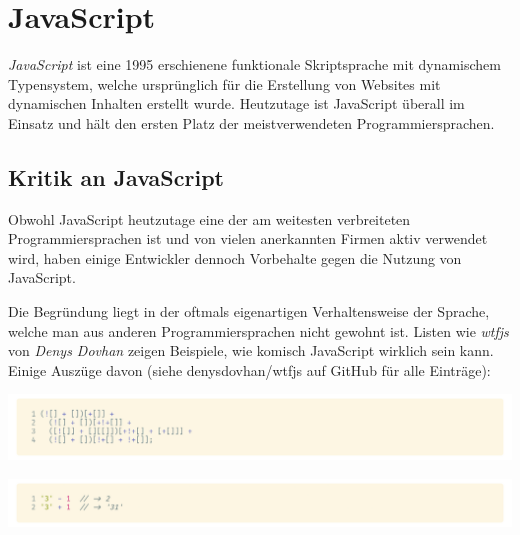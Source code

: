 \section{JavaScript}
\label{javascript}

\textit{JavaScript} ist eine 1995 erschienene funktionale Skriptsprache mit dynamischem Typensystem, welche ursprünglich für die Erstellung von Websites mit dynamischen Inhalten erstellt wurde. Heutzutage ist JavaScript überall im Einsatz und hält den ersten Platz der meistverwendeten Programmiersprachen. \cite{technostacks2021}

\subsection{Kritik an JavaScript}

Obwohl JavaScript heutzutage eine der am weitesten verbreiteten Programmiersprachen ist und von vielen anerkannten Firmen aktiv verwendet wird, haben einige Entwickler dennoch Vorbehalte gegen die Nutzung von JavaScript.~\cite{keenetheng2016}

Die Begründung liegt in der oftmals eigenartigen Verhaltensweise der Sprache, welche man aus anderen Programmiersprachen nicht gewohnt ist. Listen wie \textit{wtfjs} von \textit{Denys Dovhan} zeigen Beispiele, wie komisch JavaScript wirklich sein kann. Einige Auszüge davon (siehe denysdovhan/wtfjs auf GitHub für alle Einträge):

\begin{code}[htp]
    \begin{center}
        \includegraphics[width=1\textwidth]{images/JavaScript/fail.png}
        \vspace{-25pt}
        \caption{\glqq fail\grqq\space in JavaScript; diese Art von JavaScript ist auch bekannt als \textit{JSFuck}}
    \end{center}
\end{code}

\begin{code}[htp]
    \begin{center}
        \includegraphics[width=1\textwidth]{images/JavaScript/coercing.png}
        \vspace{-25pt}
        \caption{Lustige Mathematik: Die Typenumwandlung (Coercing) in JavaScript ...}
    \end{center}
\end{code}